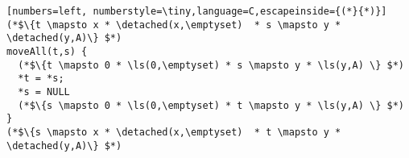 \begin{figure*}
{\begin{lstlisting}[numbers=left, numberstyle=\tiny,language=C,escapeinside={(*}{*)}]
(*$\{t \mapsto x * \detached(x,\emptyset)  * s \mapsto y * \detached(y,A)\} $*)
moveAll(t,s) {
  (*$\{t \mapsto 0 * \ls(0,\emptyset) * s \mapsto y * \ls(y,A) \} $*)
  *t = *s;
  *s = NULL
  (*$\{s \mapsto 0 * \ls(0,\emptyset) * t \mapsto y * \ls(y,A) \} $*)
}
(*$\{s \mapsto x * \detached(x,\emptyset)  * t \mapsto y * \detached(y,A)\} $*)
\end{lstlisting}
}
\caption{\label{fig:HazardSet}An implementation of a set with master permission to elements (nodes) in the shared state.
The set is implemented as a singly linked list, where the links are stored in the first cell of every detached node.
The only actions on the shared state that the set procedures are allowed to execute are $\textsf{Id}$ and $\textsf{Write}$.}
\end{figure*}



